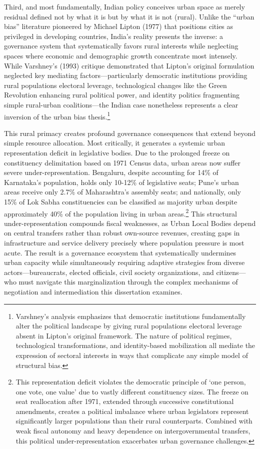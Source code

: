 Third, and most fundamentally, Indian policy conceives urban space as merely residual defined not by what it is but by what it is not (rural). Unlike the ``urban bias'' literature pioneered by Michael Lipton (1977) that positions cities as privileged in developing countries, India's reality presents the inverse: a governance system that systematically favors rural interests while neglecting spaces where economic and demographic growth concentrate most intensely. While Varshney's (1993) critique demonstrated that Lipton's original formulation neglected key mediating factors—particularly democratic institutions providing rural populations electoral leverage, technological changes like the Green Revolution enhancing rural political power, and identity politics fragmenting simple rural-urban coalitions—the Indian case nonetheless represents a clear inversion of the urban bias thesis.\footnote{Varshney's analysis emphasizes that democratic institutions fundamentally alter the political landscape by giving rural populations electoral leverage absent in Lipton's original framework. The nature of political regimes, technological transformations, and identity-based mobilization all mediate the expression of sectoral interests in ways that complicate any simple model of structural bias.}

This rural primacy creates profound governance consequences that extend beyond simple resource allocation. Most critically, it generates a systemic urban representation deficit in legislative bodies. Due to the prolonged freeze on constituency delimitation based on 1971 Census data, urban areas now suffer severe under-representation. Bengaluru, despite accounting for 14\% of Karnataka's population, holds only 10-12\% of legislative seats; Pune's urban areas receive only 2.7\% of Maharashtra's assembly seats; and nationally, only 15\% of Lok Sabha constituencies can be classified as majority urban despite approximately 40\% of the population living in urban areas.\footnote{This representation deficit violates the democratic principle of `one person, one vote, one value' due to vastly different constituency sizes. The freeze on seat reallocation after 1971, extended through successive constitutional amendments, creates a political imbalance where urban legislators represent significantly larger populations than their rural counterparts. Combined with weak fiscal autonomy and heavy dependence on intergovernmental transfers, this political under-representation exacerbates urban governance challenges.} This structural under-representation compounds fiscal weaknesses, as Urban Local Bodies depend on central transfers rather than robust own-source revenues, creating gaps in infrastructure and service delivery precisely where population pressure is most acute. The result is a governance ecosystem that systematically undermines urban capacity while simultaneously requiring adaptive strategies from diverse actors—bureaucrats, elected officials, civil society organizations, and citizens—who must navigate this marginalization through the complex mechanisms of negotiation and intermediation this dissertation examines.

